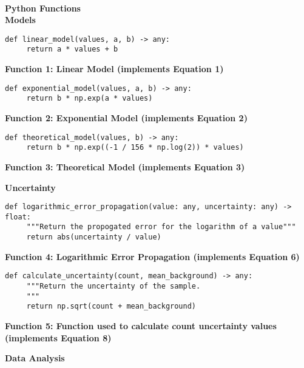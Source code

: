\documentclass[
	letterpaper, %
	10pt, %
]{CSUniSchoolLabReport}
\begin{document}
\vspace{20pt}\\
{\Large\textbf{Python Functions}}
\vspace{20pt}\\
{\large\textbf{Models}}
\begin{verbatim}
def linear_model(values, a, b) -> any:
     return a * values + b
\end{verbatim}
\begin{center}
	\textbf{Function 1: Linear Model (implements Equation 1)}
\end{center}
\vspace{5pt}
\begin{verbatim}
def exponential_model(values, a, b) -> any:
     return b * np.exp(a * values)
\end{verbatim}
\begin{center}
	\textbf{Function 2: Exponential Model (implements Equation 2)}
\end{center}
\vspace{5pt}
\begin{verbatim}
def theoretical_model(values, b) -> any:
     return b * np.exp((-1 / 156 * np.log(2)) * values)
\end{verbatim}
\begin{center}
	\textbf{Function 3: Theoretical Model (implements Equation 3)}
\end{center}
\vspace{10pt}
{\large\textbf{Uncertainty}}
\begin{verbatim}
def logarithmic_error_propagation(value: any, uncertainty: any) -> float:
     """Return the propogated error for the logarithm of a value"""
     return abs(uncertainty / value)
\end{verbatim}
\begin{center}
	\textbf{Function 4: Logarithmic Error Propagation (implements Equation 6)}
\end{center}
\vspace{10pt}
\begin{verbatim}
def calculate_uncertainty(count, mean_background) -> any:
     """Return the uncertainty of the sample.
     """
     return np.sqrt(count + mean_background)
\end{verbatim}
\begin{center}
	\textbf{Function 5: Function used to calculate count uncertainty values (implements Equation 8)}
\end{center}
\vspace{10pt}
{\large\textbf{Data Analysis}}
\end{document}
